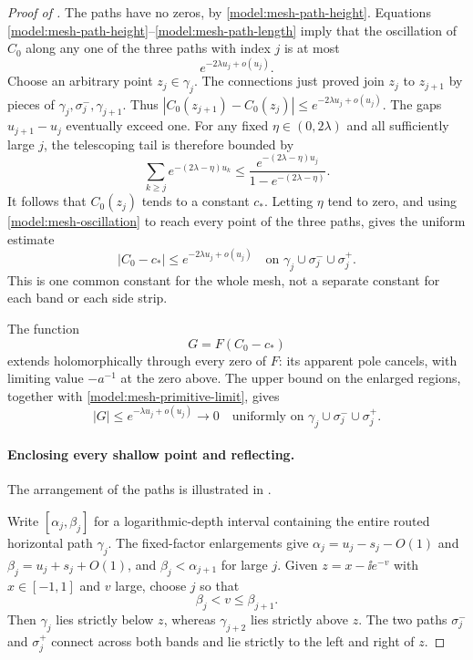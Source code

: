 \begin{proof}[Proof of ]
The paths have no zeros, by \eqref{model:mesh-path-height}.  Equations
\eqref{model:mesh-path-height}--\eqref{model:mesh-path-length} imply
that the oscillation of \(C_0\) along any one of the three paths with
index \(j\) is at most
\begin{equation}
 e^{-2\lambda u_j+o(u_j)}.
 \label{model:mesh-oscillation}
\end{equation}
Choose an arbitrary point \(z_j\in\gamma_j\).  The connections just
proved join \(z_j\) to \(z_{j+1}\) by pieces of
\(\gamma_j,\sigma_j^-,\gamma_{j+1}\).  Thus
\(|C_0(z_{j+1})-C_0(z_j)|\le e^{-2\lambda u_j+o(u_j)}\).
The gaps \(u_{j+1}-u_j\) eventually exceed one.  For any fixed
\(\eta\in(0,2\lambda)\) and all sufficiently large \(j\), the
telescoping tail is therefore bounded by
\[
 \sum_{k\ge j}e^{-(2\lambda-\eta)u_k}
 \le \frac{e^{-(2\lambda-\eta)u_j}}
 {1-e^{-(2\lambda-\eta)}}.
\]
It follows that \(C_0(z_j)\) tends to a constant \(c_*\).  Letting
\(\eta\) tend to zero, and using
\eqref{model:mesh-oscillation} to reach every point of the three
paths, gives the uniform estimate
\begin{equation}
 |C_0-c_*|\le e^{-2\lambda u_j+o(u_j)}
 \quad\text{on }\gamma_j\cup\sigma_j^-\cup\sigma_j^+.
 \label{model:mesh-primitive-limit}
\end{equation}
This is one common constant for the whole mesh, not a separate
constant for each band or each side strip.

The function
\begin{equation}
 G=F(C_0-c_*)
 \label{model:mesh-vanishing-function}
\end{equation}
extends holomorphically through every zero of \(F\): its apparent
pole cancels, with limiting value \(-a^{-1}\) at the zero above.
The upper bound on the enlarged regions, together with
\eqref{model:mesh-primitive-limit}, gives
\begin{equation}
 |G|\le e^{-\lambda u_j+o(u_j)}\longrightarrow0
 \quad\text{uniformly on }
 \gamma_j\cup\sigma_j^-\cup\sigma_j^+.
 \label{model:mesh-G-bound}
\end{equation}

\paragraph{Enclosing every shallow point and reflecting.}
The arrangement of the paths is illustrated in .

Write \([\alpha_j,\beta_j]\) for a logarithmic-depth interval
containing the entire routed horizontal path \(\gamma_j\).  The
fixed-factor enlargements give
\(\alpha_j=u_j-s_j-O(1)\) and
\(\beta_j=u_j+s_j+O(1)\), and
\(\beta_j<\alpha_{j+1}\) for large \(j\).
Given \(z=x-\ii e^{-v}\) with \(x\in[-1,1]\) and \(v\) large,
choose \(j\) so that
\[
 \beta_j<v\le\beta_{j+1}.
\]
Then \(\gamma_j\) lies strictly below \(z\), whereas
\(\gamma_{j+2}\) lies strictly above \(z\).  The two paths
\(\sigma_j^-\) and \(\sigma_j^+\) connect across both bands and
lie strictly to the left and right of \(z\).


\end{proof}

